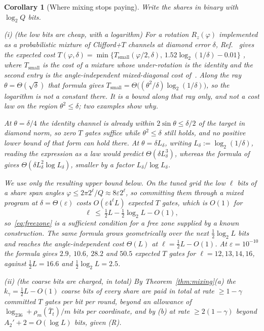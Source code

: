 \documentclass[aps,prx,twocolumn,superscriptaddress,nofootinbib,longbibliography]{revtex4-2}
\theoremstyle{plain}
\newtheorem{corollary}{Corollary}
\theoremstyle{definition}
\theoremstyle{remark}
\begin{document}
\begin{corollary}[Where mixing stops paying]\label{cor:mixstop}
Write the shares in binary with $\log_2Q$ bits.

(i) \emph{(the low bits are cheap, with a logarithm)} For a rotation $R_z(\varphi)$ implemented as a probabilistic mixture of Clifford+$T$ channels at diamond error $\delta$, Ref.~\cite{Bothe} gives the expected cost $T(\varphi,\delta)=\min\{T_{\mathrm{small}}(\varphi/2,\delta),\,1.52\log_2(1/\delta)-0.01\}$ \cite[Eqs.~(9)--(12), in the convention $R_Z(\theta)=e^{i\theta Z}$]{Bothe}, where $T_{\mathrm{small}}$ is the cost of a mixture whose under-rotation is the identity and the second entry is the angle-independent mixed-diagonal cost of~\cite{KLMPP}. Along the ray $\theta=\Theta(\sqrt\delta)$ that formula gives $T_{\mathrm{small}}=\Theta\big((\theta^2/\delta)\log_2(1/\delta)\big)$, so the logarithm is not a constant there. It is a bound along that ray only, and not a cost law on the region $\theta^2\le\delta$; two examples show why. 

At $\theta=\delta/4$ the identity channel is already within $2\sin\theta\le\delta/2$ of the target in diamond norm, so zero $T$ gates suffice while $\theta^2\le\delta$ still holds, and no positive lower bound of that form can hold there. At $\theta=\delta L_\delta$, writing $L_\delta:=\log_2(1/\delta)$, reading the expression as a law would predict $\Theta(\delta L_\delta^3)$, whereas the formula of~\cite{Bothe} gives $\Theta(\delta L_\delta^2\log L_\delta)$, smaller by a factor $L_\delta/\log L_\delta$. 

We use only the resulting \emph{upper} bound below. On the tuned grid the low $\ell$ bits of a share span angles $\varphi\le2\pi2^\ell/Q\approx8\varepsilon2^\ell$, so committing them through a mixed program at $\delta=\Theta(\varepsilon)$ costs $O(\varepsilon4^\ell L)$ expected $T$ gates, which is $O(1)$ for
\begin{equation}\label{eq:freezone}
\ell\ \le\ \tfrac12L-\tfrac12\log_2L-O(1),
\end{equation}
so~\eqref{eq:freezone} is a sufficient condition for a free zone supplied by a known construction. The same formula grows geometrically over the next $\tfrac12\log_2L$ bits and reaches the angle-independent cost $\Theta(L)$ at $\ell=\tfrac12L-O(1)$. At $\varepsilon=10^{-10}$ the formula gives $2.9$, $10.6$, $28.2$ and $50.5$ expected $T$ gates for $\ell=12,13,14,16$, against $\tfrac12L=16.6$ and $\tfrac12\log_2L=2.5$.

(ii) \emph{(the coarse bits are charged, in total)} By Theorem~\ref{thm:mixing}(a) the $k_\gamma=\tfrac12L-O(1)$ coarse bits of every share are paid \emph{in total} at rate $\ge1-\gamma$ committed $T$ gates per bit per round, beyond an allowance of $\log_236+\rho_m(\bar T_t)/m$ bits per coordinate, and by (b) at rate $\ge2(1-\gamma)$ beyond $A_2'+2=O(\log L)$ bits, given (R).
\end{corollary}
\end{document}
